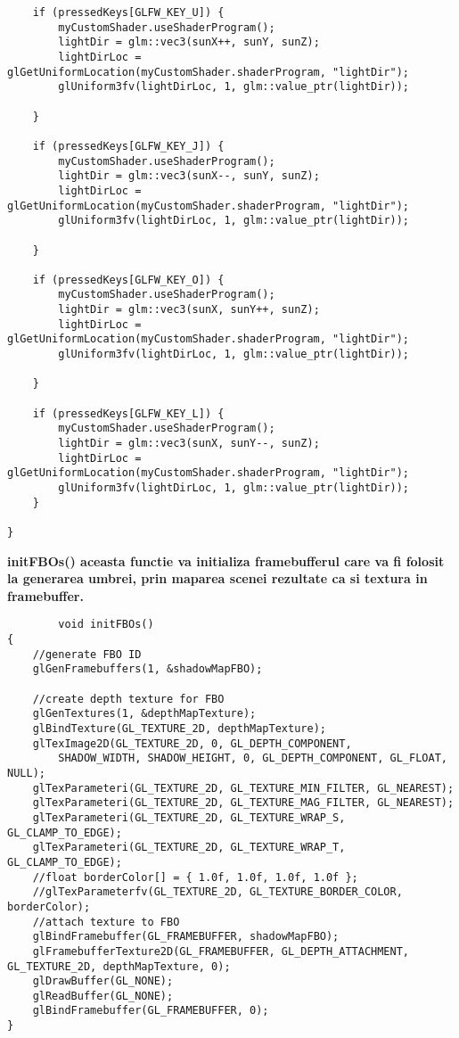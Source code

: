 \begin{itemize}
\begin{verbatim}
	if (pressedKeys[GLFW_KEY_U]) {
		myCustomShader.useShaderProgram();
		lightDir = glm::vec3(sunX++, sunY, sunZ);
		lightDirLoc = glGetUniformLocation(myCustomShader.shaderProgram, "lightDir");
		glUniform3fv(lightDirLoc, 1, glm::value_ptr(lightDir));

	}

	if (pressedKeys[GLFW_KEY_J]) {
		myCustomShader.useShaderProgram();
		lightDir = glm::vec3(sunX--, sunY, sunZ);
		lightDirLoc = glGetUniformLocation(myCustomShader.shaderProgram, "lightDir");
		glUniform3fv(lightDirLoc, 1, glm::value_ptr(lightDir));

	}

	if (pressedKeys[GLFW_KEY_O]) {
		myCustomShader.useShaderProgram();
		lightDir = glm::vec3(sunX, sunY++, sunZ);
		lightDirLoc = glGetUniformLocation(myCustomShader.shaderProgram, "lightDir");
		glUniform3fv(lightDirLoc, 1, glm::value_ptr(lightDir));

	}

	if (pressedKeys[GLFW_KEY_L]) {
		myCustomShader.useShaderProgram();
		lightDir = glm::vec3(sunX, sunY--, sunZ);
		lightDirLoc = glGetUniformLocation(myCustomShader.shaderProgram, "lightDir");
		glUniform3fv(lightDirLoc, 1, glm::value_ptr(lightDir));
	}

}
	\end{verbatim}

	\tab \tab \bf{initFBOs()} aceasta functie va initializa framebufferul care va fi folosit la generarea umbrei, prin maparea scenei rezultate ca si textura in framebuffer.\\
	\begin{verbatim}
		void initFBOs()
{
	//generate FBO ID
	glGenFramebuffers(1, &shadowMapFBO);

	//create depth texture for FBO
	glGenTextures(1, &depthMapTexture);
	glBindTexture(GL_TEXTURE_2D, depthMapTexture);
	glTexImage2D(GL_TEXTURE_2D, 0, GL_DEPTH_COMPONENT,
		SHADOW_WIDTH, SHADOW_HEIGHT, 0, GL_DEPTH_COMPONENT, GL_FLOAT, NULL);
	glTexParameteri(GL_TEXTURE_2D, GL_TEXTURE_MIN_FILTER, GL_NEAREST);
	glTexParameteri(GL_TEXTURE_2D, GL_TEXTURE_MAG_FILTER, GL_NEAREST);
	glTexParameteri(GL_TEXTURE_2D, GL_TEXTURE_WRAP_S, GL_CLAMP_TO_EDGE);
	glTexParameteri(GL_TEXTURE_2D, GL_TEXTURE_WRAP_T, GL_CLAMP_TO_EDGE);
	//float borderColor[] = { 1.0f, 1.0f, 1.0f, 1.0f };
	//glTexParameterfv(GL_TEXTURE_2D, GL_TEXTURE_BORDER_COLOR, borderColor);
	//attach texture to FBO
	glBindFramebuffer(GL_FRAMEBUFFER, shadowMapFBO);
	glFramebufferTexture2D(GL_FRAMEBUFFER, GL_DEPTH_ATTACHMENT, GL_TEXTURE_2D, depthMapTexture, 0);
	glDrawBuffer(GL_NONE);
	glReadBuffer(GL_NONE);
	glBindFramebuffer(GL_FRAMEBUFFER, 0);
}
	\end{verbatim}


\end{itemize}
